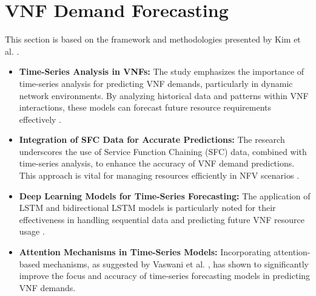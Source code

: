 \section{VNF Demand Forecasting}

This section is based on the framework and methodologies presented by Kim et al. \cite{Kim2023}.

\begin{itemize}
    \item \textbf{Time-Series Analysis in VNFs:} The study emphasizes the importance of time-series analysis for predicting VNF demands, particularly in dynamic network environments. By analyzing historical data and patterns within VNF interactions, these models can forecast future resource requirements effectively \cite{Kim2023, Hochreiter1997}.

    \item \textbf{Integration of SFC Data for Accurate Predictions:} The research underscores the use of Service Function Chaining (SFC) data, combined with time-series analysis, to enhance the accuracy of VNF demand predictions. This approach is vital for managing resources efficiently in NFV scenarios \cite{Mijumbi2016, Graves2005}.

    \item \textbf{Deep Learning Models for Time-Series Forecasting:} The application of LSTM and bidirectional LSTM models is particularly noted for their effectiveness in handling sequential data and predicting future VNF resource usage \cite{Tang2015, Graves2005}.

    \item \textbf{Attention Mechanisms in Time-Series Models:} Incorporating attention-based mechanisms, as suggested by Vaswani et al. \cite{Vaswani2017}, has shown to significantly improve the focus and accuracy of time-series forecasting models in predicting VNF demands.
\end{itemize}